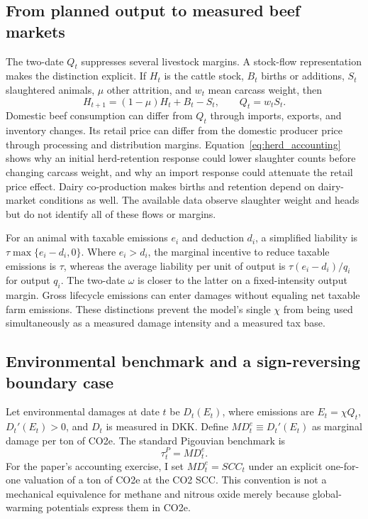 \documentclass[11pt]{article}
\begin{document}
\subsection{From planned output to measured beef markets}
The two-date $Q_t$ suppresses several livestock margins. A stock-flow representation makes the distinction explicit. If $H_t$ is the cattle stock, $B_t$ births or additions, $S_t$ slaughtered animals, $\mu$ other attrition, and $w_t$ mean carcass weight, then
\begin{equation}\label{eq:herd_accounting}
H_{t+1}=(1-\mu)H_t+B_t-S_t,\qquad Q_t=w_tS_t.
\end{equation}
Domestic beef consumption can differ from $Q_t$ through imports, exports, and inventory changes. Its retail price can differ from the domestic producer price through processing and distribution margins. Equation~\eqref{eq:herd_accounting} shows why an initial herd-retention response could lower slaughter counts before changing carcass weight, and why an import response could attenuate the retail price effect. Dairy co-production makes births and retention depend on dairy-market conditions as well. The available data observe slaughter weight and heads but do not identify all of these flows or margins.

For an animal with taxable emissions $e_i$ and deduction $d_i$, a simplified liability is $\tau\max\{e_i-d_i,0\}$. Where $e_i>d_i$, the marginal incentive to reduce taxable emissions is $\tau$, whereas the average liability per unit of output is $\tau(e_i-d_i)/q_i$ for output $q_i$. The two-date $\omega$ is closer to the latter on a fixed-intensity output margin. Gross lifecycle emissions can enter damages without equaling net taxable farm emissions. These distinctions prevent the model's single $\chi$ from being used simultaneously as a measured damage intensity and a measured tax base.

\subsection{Environmental benchmark and a sign-reversing boundary case}
Let environmental damages at date $t$ be $D_t(E_t)$, where emissions are $E_t=\chi Q_t$, $D_t'(E_t)>0$, and $D_t$ is measured in DKK. Define $MD_t^e\equiv D_t'(E_t)$ as marginal damage per ton of CO2e. The standard Pigouvian benchmark is
\begin{equation}\label{eq:pigou}
\tau_t^P=MD_t^e.
\end{equation}
For the paper's accounting exercise, I set $MD_t^e=SCC_t$ under an explicit one-for-one valuation of a ton of CO2e at the CO2 SCC. This convention is not a mechanical equivalence for methane and nitrous oxide merely because global-warming potentials express them in CO2e.
\end{document}
